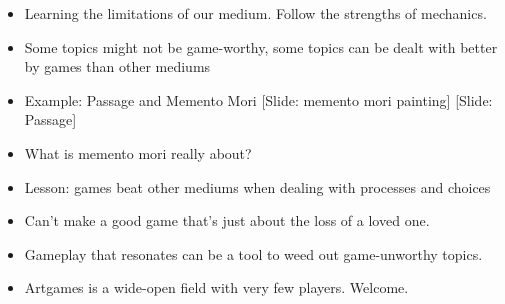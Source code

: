 \documentclass[12pt]{article}
\begin{document}
{\begin{itemize}
\item Learning the limitations of our medium.  Follow the strengths of mechanics.
 
\item Some topics might not be game-worthy, some topics can be dealt with better by games than other mediums

\item Example:  Passage and Memento Mori [Slide: memento mori painting] [Slide:  Passage]

\item What is memento mori really about?

\item Lesson:  games beat other mediums when dealing with processes and choices

\item Can't make a good game that's just about the loss of a loved one.

\item Gameplay that resonates can be a tool to weed out game-unworthy topics.

\item Artgames is a wide-open field with very few players.  Welcome.

\end{itemize}
}
\end{document}
